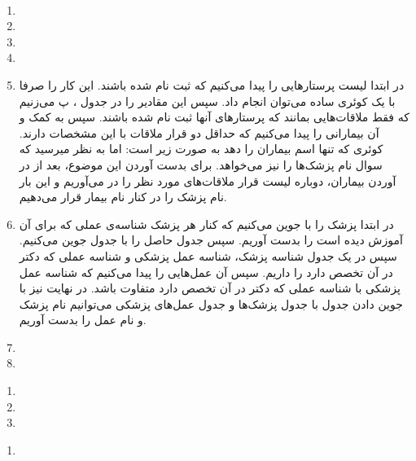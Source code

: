 \\
\begin{enumerate}
    \item \hfill {}
    \item \hfill {}
    \item \hfill {}
    \item \hfill {}
    \item در ابتدا لیست پرستار‌هایی را پیدا می‌کنیم که ثبت نام شده باشند. این کار را صرفا با یک کوئری ساده
    می‌توان انجام داد. سپس این مقادیر را در جدول
    ، پ
    می‌زنیم که فقط ملاقات‌هایی بمانند که پرستار‌های آنها ثبت نام شده باشند.
    سپس به کمک
     و 
    آن بیمارانی را پیدا می‌کنیم که حداقل دو قرار ملاقات با این مشخصات دارند. کوئری که تنها اسم بیماران را دهد
    به صورت زیر است:
    \noindent
    اما به نظر میرسید که سوال نام پزشک‌ها را نیز می‌خواهد. برای بدست آوردن این موضوع، بعد از در آوردن
    بیماران، دوباره لیست قرار ملاقات‌های مورد نظر را در می‌آوریم و این بار نام پزشک را
    در کنار نام بیمار قرار می‌دهیم.
    \item در ابتدا پزشک را با
    جوین می‌کنیم که کنار هر پزشک شناسه‌ی عملی که برای آن آموزش دیده است را بدست آوریم.
    سپس جدول حاصل را با جدول
    جوین می‌کنیم. سپس در یک جدول شناسه پزشک، شناسه عمل پزشکی و شناسه عملی که دکتر در آن تخصص دارد را داریم.
    سپس آن عمل‌هایی را پیدا می‌کنیم که شناسه عمل پزشکی با شناسه عملی که دکتر در آن تخصص دارد متفاوت باشد.
    در نهایت نیز با جوین دادن جدول با جدول پزشک‌ها و جدول عمل‌های پزشکی می‌توانیم نام پزشک و نام عمل را بدست
    آوریم.
    \item \hfill {}
    \item \hfill {}
\end{enumerate}
\begin{enumerate}
    \item \hfill {}
    \item \hfill {}
    \item \hfill {}
\end{enumerate}
\begin{enumerate}
    \item \hfill {}
\end{enumerate}